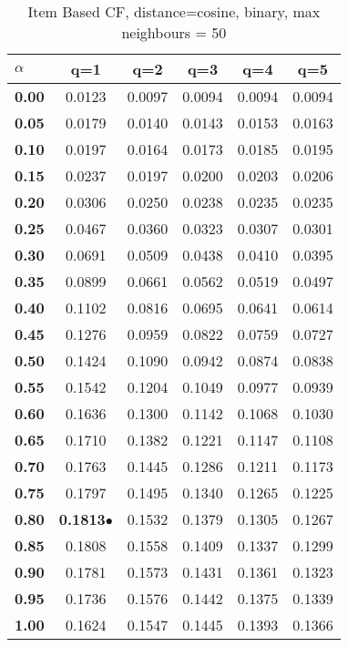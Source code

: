 \begin{table}
\begin{center}
\begin{tabular}{ | l || c | c | c | c | c |}
\hline
\textbf{$\alpha$} & \textbf{q=1} & \textbf{q=2} & \textbf{q=3} & \textbf{q=4} & \textbf{q=5} \\
\hline
\textbf{0.00} & 0.0123 & 0.0097 & 0.0094 & 0.0094 & 0.0094\\
\hline
\textbf{0.05} & 0.0179 & 0.0140 & 0.0143 & 0.0153 & 0.0163\\
\hline
\textbf{0.10} & 0.0197 & 0.0164 & 0.0173 & 0.0185 & 0.0195\\
\hline
\textbf{0.15} & 0.0237 & 0.0197 & 0.0200 & 0.0203 & 0.0206\\
\hline
\textbf{0.20} & 0.0306 & 0.0250 & 0.0238 & 0.0235 & 0.0235\\
\hline
\textbf{0.25} & 0.0467 & 0.0360 & 0.0323 & 0.0307 & 0.0301\\
\hline
\textbf{0.30} & 0.0691 & 0.0509 & 0.0438 & 0.0410 & 0.0395\\
\hline
\textbf{0.35} & 0.0899 & 0.0661 & 0.0562 & 0.0519 & 0.0497\\
\hline
\textbf{0.40} & 0.1102 & 0.0816 & 0.0695 & 0.0641 & 0.0614\\
\hline
\textbf{0.45} & 0.1276 & 0.0959 & 0.0822 & 0.0759 & 0.0727\\
\hline
\textbf{0.50} & 0.1424 & 0.1090 & 0.0942 & 0.0874 & 0.0838\\
\hline
\textbf{0.55} & 0.1542 & 0.1204 & 0.1049 & 0.0977 & 0.0939\\
\hline
\textbf{0.60} & 0.1636 & 0.1300 & 0.1142 & 0.1068 & 0.1030\\
\hline
\textbf{0.65} & 0.1710 & 0.1382 & 0.1221 & 0.1147 & 0.1108\\
\hline
\textbf{0.70} & 0.1763 & 0.1445 & 0.1286 & 0.1211 & 0.1173\\
\hline
\textbf{0.75} & 0.1797 & 0.1495 & 0.1340 & 0.1265 & 0.1225\\
\hline
\textbf{0.80} & \textbf{0.1813}$\bullet$ & 0.1532 & 0.1379 & 0.1305 & 0.1267\\
\hline
\textbf{0.85} & 0.1808 & 0.1558 & 0.1409 & 0.1337 & 0.1299\\
\hline
\textbf{0.90} & 0.1781 & 0.1573 & 0.1431 & 0.1361 & 0.1323\\
\hline
\textbf{0.95} & 0.1736 & 0.1576 & 0.1442 & 0.1375 & 0.1339\\
\hline
\textbf{1.00} & 0.1624 & 0.1547 & 0.1445 & 0.1393 & 0.1366\\
\hline
\end{tabular}
\caption{Item Based CF, distance=cosine, binary, max neighbours = 50}
\label{table:MAP_icf_cosine_binary_mnn=50}
\end{center}
\end{table}
